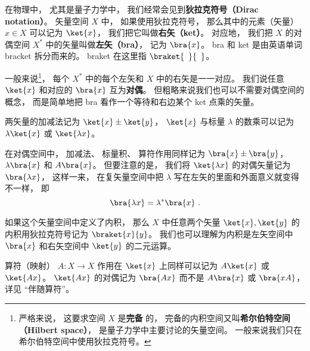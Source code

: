 

在物理中， 尤其是量子力学中， 我们经常会见到\textbf{狄拉克符号（Dirac notation）}。 矢量空间 $X$ 中， 如果使用狄拉克符号， 那么其中的元素（矢量） $x\in X$ 可以记为 $\ket{x}$， 我们把它叫做\textbf{右矢（ket）}。 对应地， 我们把 $X$ 的对偶空间 $X^*$ 中的矢量叫做\textbf{左矢（bra）}， 记为 $\bra{x}$。 bra 和 ket 是由英语单词 bracket 拆分而来的。 braket 在这里指 $\braket{\phantom{1}}{\phantom{1}}$。

一般来说\footnote{严格来说， 这要求空间 $X$ 是\textbf{完备}%
的， 完备的内积空间又叫\textbf{希尔伯特空间（Hilbert space）}， 是量子力学中主要讨论的矢量空间。 一般来说我们只在希尔伯特空间中使用狄拉克符号。}， 每个 $X^*$ 中的每个左矢和 $X$ 中的右矢是一一对应。 我们说任意 $\ket{x}$ 和对应的 $\bra{x}$ 互为\textbf{对偶}。 但粗略来说我们也可以不需要对偶空间的概念， 而是简单地把 bra 看作一个等待和右边某个 ket 点乘的矢量。

两矢量的加减法记为 $\ket{x} \pm \ket{y}$， $\ket{x}$ 与标量 $\lambda$ 的数乘可以记为 $\lambda\ket{x}$ 或 $\ket{\lambda x}$。

在对偶空间中， 加减法、 标量积、 算符作用同样记为 $\bra{x} \pm \bra{y}$， $\lambda\bra{x}$ 和 $A\bra{x}$。 但要注意的是， 我们将 $\ket{\lambda x}$ 的对偶矢量记为 $\bra{\lambda x}$， 这样一来， 在复矢量空间中把 $\lambda$ 写在左矢的里面和外面意义就变得不一样， 即 %
\begin{equation}
\bra{\lambda x} = \lambda^* \bra{x}~.
\end{equation}

如果这个矢量空间中定义了内积， 那么 $X$ 中任意两个矢量 $\ket{x}, \ket{y}$ 的内积用狄拉克符号记为 $\braket{x}{y}$。 我们也可以理解为内积是左矢空间中 $\bra{x}$ 和右矢空间中 $\ket{y}$ 的二元运算。

算符（映射） $A:X\to X$ 作用在 $\ket{x}$ 上同样可以记为 $A\ket{x}$ 或 $\ket{Ax}$。 $\ket{Ax}$ 的对偶记为 $\bra{Ax}$ 而不是 $A\bra{x}$ 或 $\bra{xA}$， 详见 “伴随算符”。

